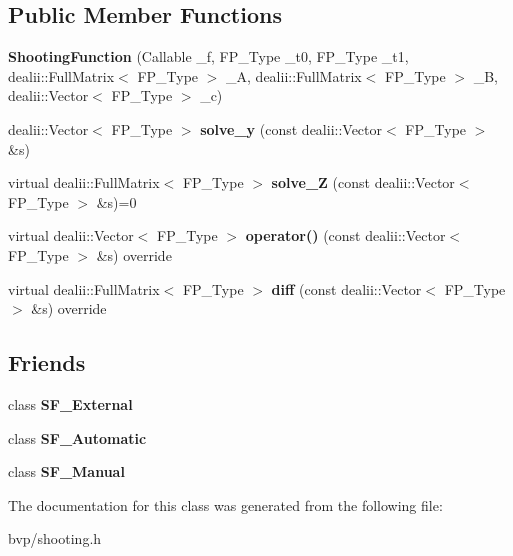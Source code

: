 \subsection*{Public Member Functions}
\begin{DoxyCompactItemize}
\item 
\mbox{\label{classShootingFunction_a2de0bb3e32d2f1a634421e76e7b27822}} 
{\bfseries Shooting\+Function} (Callable \+\_\+f, F\+P\+\_\+\+Type \+\_\+t0, F\+P\+\_\+\+Type \+\_\+t1, dealii\+::\+Full\+Matrix$<$ F\+P\+\_\+\+Type $>$ \+\_\+A, dealii\+::\+Full\+Matrix$<$ F\+P\+\_\+\+Type $>$ \+\_\+B, dealii\+::\+Vector$<$ F\+P\+\_\+\+Type $>$ \+\_\+c)
\item 
\mbox{\label{classShootingFunction_a7dc73817aa954ae7155d3aecf1d737aa}} 
dealii\+::\+Vector$<$ F\+P\+\_\+\+Type $>$ {\bfseries solve\+\_\+y} (const dealii\+::\+Vector$<$ F\+P\+\_\+\+Type $>$ \&s)
\item 
\mbox{\label{classShootingFunction_aca84d5084f5c1f7fd47932c3985a55dd}} 
virtual dealii\+::\+Full\+Matrix$<$ F\+P\+\_\+\+Type $>$ {\bfseries solve\+\_\+Z} (const dealii\+::\+Vector$<$ F\+P\+\_\+\+Type $>$ \&s)=0
\item 
\mbox{\label{classShootingFunction_a93ce0f0b470881a6541ac9669382f4b1}} 
virtual dealii\+::\+Vector$<$ F\+P\+\_\+\+Type $>$ {\bfseries operator()} (const dealii\+::\+Vector$<$ F\+P\+\_\+\+Type $>$ \&s) override
\item 
\mbox{\label{classShootingFunction_a8fc42a11dcff86f7ed757d4a008f458e}} 
virtual dealii\+::\+Full\+Matrix$<$ F\+P\+\_\+\+Type $>$ {\bfseries diff} (const dealii\+::\+Vector$<$ F\+P\+\_\+\+Type $>$ \&s) override
\end{DoxyCompactItemize}
\subsection*{Friends}
\begin{DoxyCompactItemize}
\item 
\mbox{\label{classShootingFunction_a93dbf39ac4cbbc98d7d42b86d98179eb}} 
class {\bfseries S\+F\+\_\+\+External}
\item 
\mbox{\label{classShootingFunction_ab9857bb910ee9206e4888bdc358f0ecb}} 
class {\bfseries S\+F\+\_\+\+Automatic}
\item 
\mbox{\label{classShootingFunction_acf7e9fe888f96c8f5b3243c0848c0fcd}} 
class {\bfseries S\+F\+\_\+\+Manual}
\end{DoxyCompactItemize}


The documentation for this class was generated from the following file\+:\begin{DoxyCompactItemize}
\item 
bvp/shooting.\+h\end{DoxyCompactItemize}
